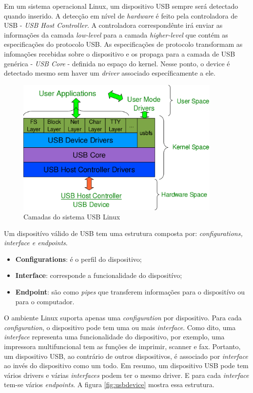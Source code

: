 Em um sistema operacional Linux, um dispositivo USB sempre será detectado quando inserido.
A detecção em nível de \textit{hardware} é feito pela controladora de USB - \textit{USB Host Controller}. A controladora
correspondênte irá enviar as informações da camada \textit{low-level} para a camada \textit{higher-level} que contém
as especificações do protocolo USB. As especificações de protocolo transformam as infomações recebidas
sobre o dispositivo e os propaga para a camada de USB genérica - \textit{USB Core} - definida no espaço
do kernel. Nesse ponto, o device é detectado mesmo sem haver um \textit{driver} associado específicamente a ele.

\begin{figure}[H]
  \centering
  \caption{Camadas do sistema USB Linux}
  \label{fig:usblinux}
  \includegraphics[width=0.9\textwidth]{figure/usbgeral.eps}
\end{figure}

Um dispositívo válido de USB tem uma estrutura composta por: \textit{configurations, interface e endpoints}.
\begin{itemize}
  \item \textbf{Configurations}: é o perfil do dispositivo;
  \item \textbf{Interface}: corresponde a funcionalidade do dispositívo;
  \item \textbf{Endpoint}: são como \textit{pipes} que transferem informações para o dispositívo ou para o computador.
\end{itemize}

O ambiente Linux suporta apenas uma \textit{configuration} por dispositivo. Para cada \textit{configuration}, o dispositivo
pode tem uma ou mais \textit{interface}. Como dito, uma \textit{interface} representa uma funcionalidade do dispositivo,
por exemplo, uma impressora multifuncional tem as funções de imprimir, scanner e fax. Portanto, um
dispositivo USB, ao contrário de outros dispositivos, é associado por \textit{interface} ao invés do dispositivo
como um todo. Em resumo, um dispositivo USB pode tem vários drivers e várias \textit{interfaces} podem ter o
mesmo driver. E para cada \textit{interface} tem-se vários \textit{endpoints}. A figura \ref{fig:usbdevice} mostra essa
estrutura.

